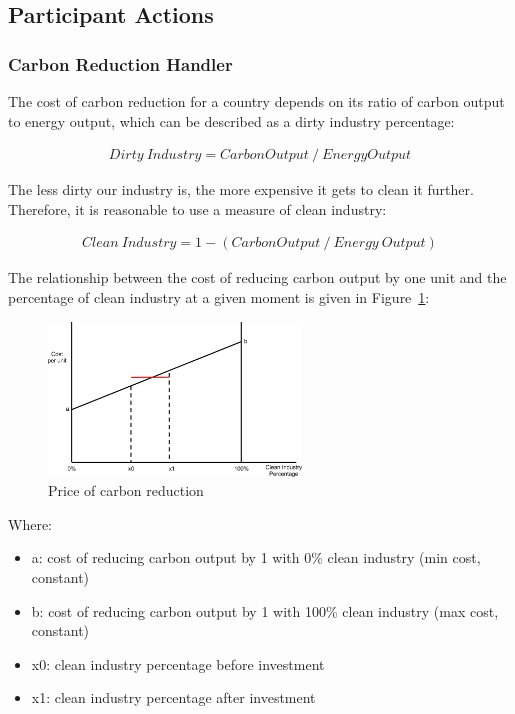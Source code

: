 \subsection{Participant Actions}

\subsubsection{Carbon Reduction Handler}

The cost of carbon reduction for a country depends on its ratio of carbon output to energy output, which can be described as a dirty industry percentage:

\begin{align*}
Dirty~Industry = Carbon Output~/~Energy Output
\end{align*}

The less dirty our industry is, the more expensive it gets to clean it further. Therefore, it is reasonable to use a measure of clean industry:

\begin{align*}
Clean~Industry = 1 - (Carbon Output~/~Energy~Output)
\end{align*}
 
The relationship between the cost of reducing carbon output by one unit and the percentage of 
clean industry at a given moment is given in Figure~\ref{fig:carbon_reduction}:

\begin{figure}[h!]
	\centering
	\includegraphics[width=0.6\textwidth]{img/carbon-reduction.png}
	\caption{Price of carbon reduction}
	\label{fig:carbon_reduction}
\end{figure}

Where:
\begin{itemize}
	\item a: cost of reducing carbon output by 1 with 0\% clean industry (min cost, constant)
	\item b: cost of reducing carbon output by 1 with 100\% clean industry (max cost, constant)
	\item x0: clean industry percentage before investment
	\item x1: clean industry percentage after investment
\end{itemize}

